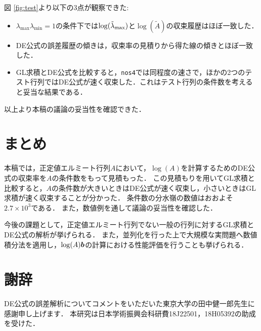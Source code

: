 \documentclass[12pt,a4paper,uplatex,dvipdfmx]{jsarticle}
\newcommand{\lmdmax}{\lambda_{\mathrm{max}}}
\newcommand{\lmdmin}{\lambda_{\mathrm{min}}}
\begin{document}
  図 \ref{fig:test}より以下の3点が観察できた:
  \begin{itemize}
    \item $\lmdmax\lmdmin=1$の条件下では$\log(\tilde{\lambda}_{\mathrm{max}})$と$\log(\tilde{A})$の収束履歴はほぼ一致した．
    \item DE公式の誤差履歴の傾きは，収束率の見積りから得た線の傾きとほぼ一致した．
    \item GL求積とDE公式を比較すると，\texttt{nos4}では同程度の速さで，ほかの2つのテスト行列ではDE公式が速く収束した．これはテスト行列の条件数を考えると妥当な結果である．
  \end{itemize}
  以上より本稿の議論の妥当性を確認できた．


  \section{まとめ}
  本稿では，正定値エルミート行列$A$において，$\log(A)$を計算するためのDE公式の収束率を$A$の条件数をもって見積もった．
  この見積もりを用いてGL求積と比較すると，$A$の条件数が大きいときはDE公式が速く収束し，小さいときはGL求積が速く収束することが分かった．
  条件数の分水嶺の数値はおおよそ$2.7\times 10^3$である．
  また，数値例を通して議論の妥当性を確認した．

  今後の課題として，正定値エルミート行列でない一般の行列に対するGL求積とDE公式の解析が挙げられる．
  また，並列化を行った上で大規模な実問題へ数値積分法を適用し，$\log(A)\bm{b}$の計算における性能評価を行うことも挙げられる．

  
  \section*{謝辞}
  DE公式の誤差解析についてコメントをいただいた東京大学の田中健一郎先生に感謝申し上げます．
  本研究は日本学術振興会科研費18J22501，18H05392の助成を受けた．

  
  
\end{document}
